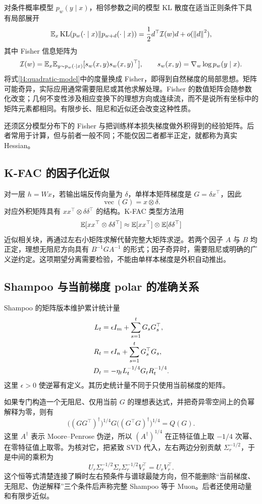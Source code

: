 对条件概率模型 $p_w(y\mid x)$，相邻参数之间的模型 KL 散度在适当正则条件下具有局部展开
\[
 \mathbb E_x\operatorname{KL}(p_w(\cdot\mid x)\|p_{w+d}(\cdot\mid x))
 =\frac12d^\top\mathcal I(w)d+o(\left\lVert d\right\rVert^2),
\]
其中 Fisher 信息矩阵为
\[
 \mathcal I(w)=\mathbb E_x\mathbb E_{y\sim p_w(\cdot\mid x)}
 [s_w(x,y)s_w(x,y)^\top],\qquad
 s_w(x,y)=\nabla_w\log p_w(y\mid x).
\]
将式\eqref{l4:quadratic-model}中的度量换成 Fisher，即得到自然梯度的局部思想。矩阵可能奇异，实际应用通常需要阻尼或其他求解处理。Fisher 的数值矩阵会随参数化改变；几何不变性涉及相应变换下的理想方向或连续流，而不是说所有坐标中的矩阵元素都相同。有限步长、阻尼和近似还会改变这种性质\citep{Martens2020}。

还须区分模型分布下的 Fisher 与把训练样本损失梯度做外积得到的经验矩阵。后者常用于计算，但与前者一般不同；不能仅因二者都半正定，就都称为真实 Hessian。

\subsection{K-FAC 的因子化近似}

对一层 $h=Wx$，若输出端反传向量为 $\delta$，单样本矩阵梯度是 $G=\delta x^\top$，因此
\[
 \operatorname{vec}(G)=x\otimes\delta.
\]
对应外积矩阵具有 $xx^\top\otimes\delta\delta^\top$ 的结构。K-FAC 类型方法用
\[
 \mathbb E[xx^\top\otimes\delta\delta^\top]
 \approx\mathbb E[xx^\top]\otimes\mathbb E[\delta\delta^\top]
\]
近似相关块，再通过左右小矩阵求解代替完整大矩阵求逆。若两个因子 $A$ 与 $B$ 均正定，理想无阻尼方向具有 $B^{-1}GA^{-1}$ 的形式；因子奇异时，需要阻尼或明确的广义逆约定。这项期望分离需要检验，不能由单样本梯度是外积自动推出。

\subsection{Shampoo 与当前梯度 polar 的准确关系}

Shampoo 的矩阵版本维护累计统计量\citep{Gupta2018}
\begin{align}
 L_t&=\epsilon I_m+\sum_{s=1}^{t}G_sG_s^\top,\notag\\
 R_t&=\epsilon I_n+\sum_{s=1}^{t}G_s^\top G_s,\notag\\
 D_t&=-\eta_tL_t^{-1/4}G_tR_t^{-1/4}.
 \label{l4:shampoo}
\end{align}
这里 $\epsilon>0$ 使逆幂有定义。其历史统计量不同于只使用当前梯度的矩阵。

如果专门构造一个无阻尼、仅用当前 $G$ 的理想表达式，并把奇异零空间上的负幂解释为零，则有
\begin{equation}
 \bigl((GG^\top)^\dagger\bigr)^{1/4}
 G\bigl((G^\top G)^\dagger\bigr)^{1/4}=Q(G).
 \label{l4:instant-shampoo-polar}
\end{equation}
这里 $A^\dagger$ 表示 Moore--Penrose 伪逆，所以 $(A^\dagger)^{1/4}$ 在正特征值上取 $-1/4$ 次幂、在零特征值上取零。为核对它，把紧致 SVD 代入，左右两边分别贡献 $\Sigma_r^{-1/2}$，于是中间的乘积为
\[
 U_r\Sigma_r^{-1/2}\Sigma_r\Sigma_r^{-1/2}V_r^\top
 =U_rV_r^\top.
\]
这个恒等式清楚连接了瞬时左右预条件与谱球最陡方向，但不能删除“当前梯度、无阻尼、伪逆解释”三个条件后声称完整 Shampoo 等于 Muon。后者还使用动量和有限步近似。

